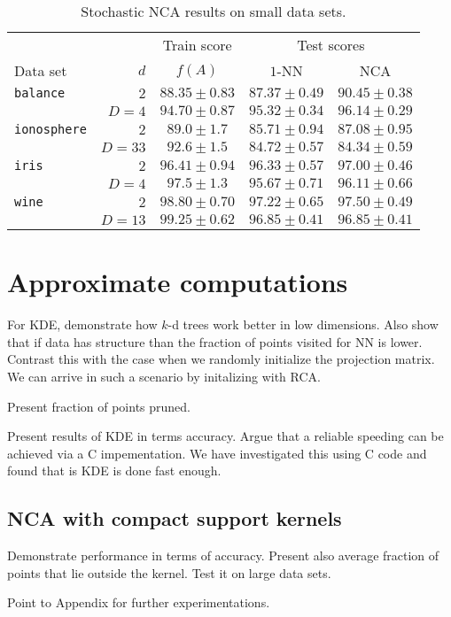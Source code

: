 \begin{description}
{    \begin{table}
      \centering\begin{tabular}{lrccc}
      \toprule
	      &     & Train score  & \multicolumn{2}{c}{Test scores}\\
      \cmidrule(r){3-3} \cmidrule(r){4-5}
      Data set & $d$ & $f(A)$ & $1$-NN & NCA \\
      \midrule
	\texttt{balance}&$2$&$88.35 \pm 0.83$&$87.37 \pm 0.49$&$90.45 \pm 0.38$\\  
	&$D=4$&$94.70 \pm 0.87$&$95.32 \pm 0.34$&$96.14 \pm 0.29$\\ 
	\midrule
	\texttt{ionosphere}&$2$&$89.0 \pm 1.7$&$85.71 \pm 0.94$&$87.08 \pm 0.95$\\
	&$D=33$&$92.6 \pm 1.5$&$84.72 \pm 0.57$&$84.34 \pm 0.59$\\ 
	\midrule
	\texttt{iris}&$2$&$96.41 \pm 0.94$&$96.33 \pm 0.57$&$97.00 \pm 0.46$\\ 
	&$D=4$&$97.5 \pm 1.3$&$95.67 \pm 0.71$&$96.11 \pm 0.66$\\ 
	\midrule
	\texttt{wine}&$2$&$98.80 \pm 0.70$&$97.22 \pm 0.65$&$97.50 \pm 0.49$\\ 
	&$D=13$&$99.25 \pm 0.62$&$96.85 \pm 0.41$&$96.85 \pm 0.41$\\ 
      \bottomrule
      \end{tabular}
      \caption{\small Stochastic NCA results on small data sets.}
    \end{table}
    }
\end{description}


\section{Approximate computations}
\label{sec:eval-nca-approx}

For KDE, demonstrate how $k$-d trees work better in low dimensions. Also show that if data has structure than the fraction of points visited for NN is lower. Contrast this with the case when we randomly initialize the projection matrix. We can arrive in such a scenario by initalizing with RCA.

Present fraction of points pruned.

Present results of KDE in terms accuracy. Argue that a reliable speeding can be achieved via a C impementation. We have investigated this using C code and found that is KDE is done fast enough.


\subsection*{NCA with compact support kernels}
\label{subsec:eval-nca-cs}

Demonstrate performance in terms of accuracy. Present also average fraction of points that lie outside the kernel. Test it on large data sets.

Point to Appendix for further experimentations.